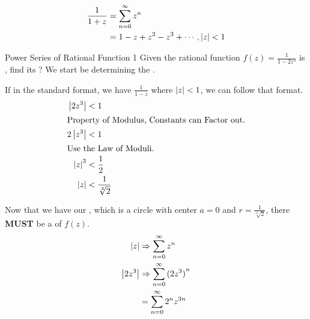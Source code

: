 \begin{equation}\label{eq:Complex_Power_Series-1+z}
  \begin{aligned}
    \frac{1}{1+z} &= \sum_{n=0}^{\infty} z^{n} \\
    &= 1 - z + z^{2} - z^{3} + \cdots \, , \left\lvert z \right\rvert < 1
  \end{aligned}
\end{equation}

\begin{example}{Power Series of Rational Function 1}
  Given the rational function $f(z) = \frac{1}{1-2z^{3}}$ is , find its ?
  \tcblower{}
  We start be determining the .

  If in the standard format, we have $\frac{1}{1-z}$ where $\left\lvert z \right\rvert < 1$, we can follow that format.
  \begin{align*}
    \left\lvert 2z^{3} \right\rvert &< 1 \\
    \shortintertext{Property of Modulus, Constants can Factor out.}
    2 \left\lvert z^{3} \right\rvert &< 1 \\
    \shortintertext{Use the Law of Moduli.}
    {\ensuremath{\left\lvert z \right\rvert}}^{3} &< \frac{1}{2} \\
    \left\lvert z \right\rvert &< \frac{1}{\sqrt[3]{2}}
  \end{align*}

  Now that we have our , which is a circle with center $a=0$ and $r = \frac{1}{\sqrt[3]{2}}$, there \textbf{MUST} be a  of $f(z)$.
  \begin{align*}
    \left\lvert z \right\rvert &\Rightarrow \sum_{n=0}^{\infty} z^{n} \\
    \left\lvert 2z^{3} \right\rvert &\Rightarrow \sum_{n=0}^{\infty} {(2z^{3})}^{n} \\
                &= \sum_{n=0}^{\infty} 2^{n} z^{3n}
  \end{align*}
\end{example}

